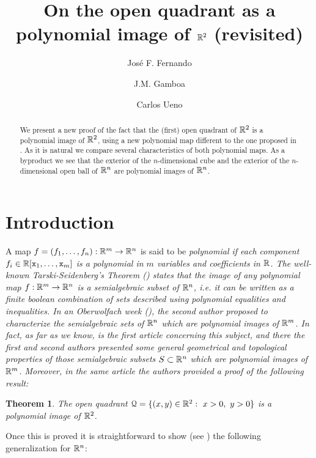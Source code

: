 \documentclass[11pt,a4paper]{amsart}
\title{On the open quadrant as a polynomial image of ${\mathbb R}^2$ (revisited)}
\author{Jos\'e F. Fernando}
\author{J.M. Gamboa}
\author{Carlos Ueno}
\newtheorem{theor}{Theorem}[section]
\theoremstyle{definition}
\theoremstyle{remark}
\newcommand{\Qq}{{\EuScript Q}}
\newcommand{\x}{{\tt x}} \newcommand{\y}{{\tt y}}
\begin{document}
\begin{abstract}
We present a new proof of the fact that the (first) open quadrant of ${\mathbb R}^2$ is a polynomial image of ${\mathbb R}^2$, using a new polynomial map different to the one proposed in \cite{fg1}. As it is natural we compare several characteristics of both polynomial maps. As a byproduct we see that the exterior of the $n$-dimensional cube and the exterior of the $n$-dimensional open ball of ${\mathbb R}^n$ are polynomial images of ${\mathbb R}^n$.
\end{abstract}
\date{}
\maketitle


\section{Introduction}\label{s1}

A map $f=(f_1,\ldots,f_n):{\mathbb R}^m\rightarrow{\mathbb R}^n$ is said to be \em polynomial \em if each component $f_i\in\R[\x_1,\ldots,\x_m]$ is a polynomial in $m$ variables and coefficients in ${\mathbb R}$. The well-known Tarski-Seidenberg's Theorem (\cite[1.4]{bcr}) states that the image of any polynomial map $f:{\mathbb R}^m\rightarrow {\mathbb R}^n$ is a semialgebraic subset of ${\mathbb R}^n$, i.e. it can be written as a finite boolean combination of sets described using polynomial equalities and inequalities. In an \em Oberwolfach \em week (\cite{g}), the second author proposed to characterize the semialgebraic sets of ${\mathbb R}^n$ which are polynomial images of ${\mathbb R}^m$. In fact, as far as we know, \cite{fg1} is the first article concerning this subject, and there the first and second authors presented some general geometrical and topological properties of those semialgebraic subsets $S\subset{\mathbb R}^n$ which are polynomial images of ${\mathbb R}^m$. Moreover, in the same article the authors provided a proof of the following result:

\begin{theor}\label{mainthm}
The open quadrant $\Qq=\{(x,y)\in\R^2:\ x>0,\ y>0\}$ is a polynomial image of ${\mathbb R}^2$.
\end{theor}

Once this is proved it is straightforward to show (see \cite[2.6]{fg1}) the following generalization for ${\mathbb R}^n$:
\end{document}
